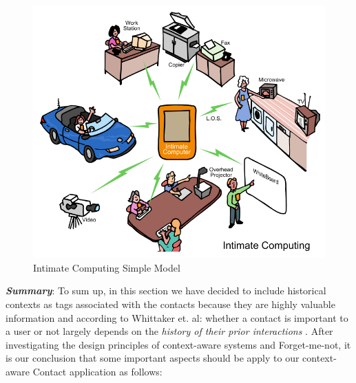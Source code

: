 \begin{figure}[!h]
\begin{centering}
\includegraphics[scale=0.6]{pics/intimate_computing}
\caption{Intimate Computing Simple Model}\label{fig:intimate_computing}
\end{centering}
\end{figure}

\textit{\textbf{Summary}}: To sum up, in this section we have decided to include historical contexts as tags associated with the contacts because they are highly valuable information and according to Whittaker et. al: whether a contact is important to a user or not largely depends on the \textit{history of their prior interactions} \cite{Whittaker2002}. After investigating the design principles of context-aware systems and Forget-me-not, it is our conclusion that some important aspects should be apply to our context-aware Contact application as follows:

